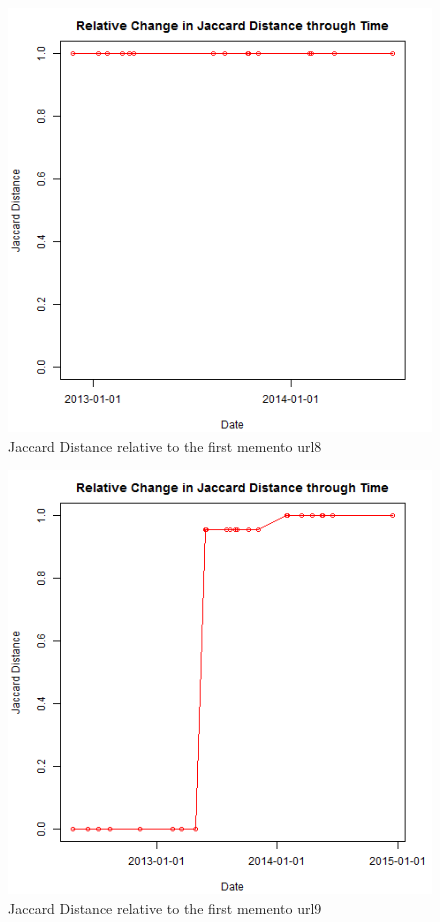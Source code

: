\begin{figure}[ht]
	\begin{center}
		 \includegraphics[scale=0.60]{url8}
		  \caption{Jaccard Distance relative to the first memento url8}
	 \end{center}
\end{figure}
\clearpage
\begin{figure}[ht]
	\begin{center}
		 \includegraphics[scale=0.60]{url9}
		  \caption{Jaccard Distance relative to the first memento url9}
	 \end{center}
\end{figure}
